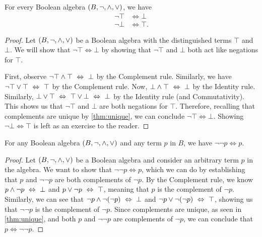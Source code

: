 \begin{lemma}
    For every Boolean algebra $(B, \neg, \wedge, \vee)$, we have
    \begin{align*}
        \neg \top &\iff \bot\\
        \neg \bot &\iff \top.
    \end{align*}
\end{lemma}
\begin{proof}
    Let $(B, \neg, \wedge, \vee)$ be a Boolean algebra with the distinguished terms $\top$ and $\bot$.
    We will show that $\neg \top \iff \bot$ by showing that
    $\neg \top$ and $\bot$ both act like negations for $\top$.

    First, observe $\neg \top \wedge \top ~\Leftrightarrow~ \bot$ by the Complement rule.
    Similarly, we have $\neg \top \vee \top ~\Leftrightarrow~ \top$ by the Complement rule.
    Now, $\bot \wedge \top ~\Leftrightarrow~ \bot$ by the Identity rule.
    Similarly, $\bot \vee \top ~\Leftrightarrow~ \top \vee \bot ~\Leftrightarrow~ \bot$ by the Identity rule
    (and Commutativity).
    This shows us that $\neg \top$ and $\bot$ are both negations for $\top$.
    Therefore, recalling that complements are unique by \autoref{thm:unique},
    we can conclude $\neg \top \iff \bot$.
    Showing $\neg \bot \iff \top$ is left as an exercise to the reader.
\end{proof}

\begin{theorem}
    For any Boolean algebra $(B, \neg, \wedge, \vee)$ and any term $p$ in $B$,
    we have $\neg \neg p \iff p$.
\end{theorem}
\begin{proof}
    Let $(B, \neg, \wedge, \vee)$ be a Boolean algebra
    and consider an arbitrary term $p$ in the algebra.
    We want to show that $\neg \neg p \iff p$,
    which we can do by establishing that $p$ and $\neg \neg p$ are both complements of $\neg p$.
    By the Complement rule, we know $p \wedge \neg p ~\Leftrightarrow~ \bot$ and $p \vee \neg p ~\Leftrightarrow~ \top$,
    meaning that $p$ is the complement of $\neg p$.
    Similarly, we can see that
    $\neg p \wedge \neg (\neg p) ~\Leftrightarrow~ \bot$ and $\neg p \vee \neg (\neg p) ~\Leftrightarrow~ \top$,
    showing us that $\neg \neg p$ is the complement of $\neg p$.
    Since complements are unique, as seen in \autoref{thm:unique},
    and both $p$ and $\neg \neg p$ are complements of $\neg p$,
    we can conclude that $p \iff \neg \neg p$.
\end{proof}

\newpage

